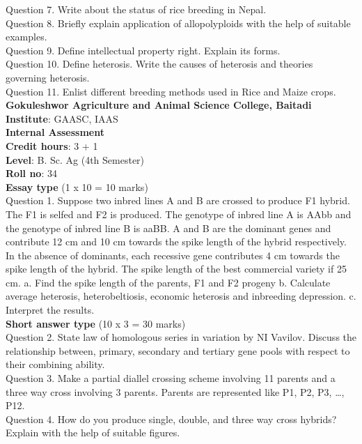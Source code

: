 \documentclass[12pt]{article}\usepackage[]{graphicx}\usepackage[]{color}
\begin{document}
Question 7. Write about the status of rice breeding in Nepal.\\
Question 8. Briefly explain application of allopolyploids with the help of suitable examples.\\
Question 9. Define intellectual property right. Explain its forms.\\
Question 10. Define heterosis. Write the causes of heterosis and theories governing heterosis.\\
Question 11. Enlist different breeding methods used in Rice and Maize crops.\\
\clearpage 
{\centering \Large{\textbf{Gokuleshwor Agriculture and Animal Science College, Baitadi}} \\[0.25cm]
            \textbf{Institute}: GAASC, IAAS \\[0.2cm]
            \textbf{Internal Assessment} \\[0.2cm]} 
\textbf{Credit hours}: 3 + 1 \\ 
\textbf{Level}: B. Sc. Ag (4th Semester) \\
\textbf{Roll no}: 34 \\[0.5cm] 
\textbf{Essay type} (1 x 10 = 10 marks) \\
Question 1. Suppose two inbred lines A and B are crossed to produce F1 hybrid. The F1 is selfed and F2 is produced. The genotype of inbred line A is AAbb and the genotype of inbred line B is aaBB. A and B are the dominant genes and contribute 12 cm and 10 cm towards the spike length of the hybrid respectively. In the absence of dominants, each recessive gene contributes 4 cm towards the spike length of the hybrid. The spike length of the best commercial variety if 25 cm. a. Find the spike length of the parents, F1 and F2 progeny b. Calculate average heterosis, heterobeltiosis, economic heterosis and inbreeding depression. c. Interpret the results.\\
\textbf{Short answer type} (10 x 3 = 30 marks) \\
Question 2. State law of homologous series in variation by NI Vavilov. Discuss the relationship between, primary, secondary and tertiary gene pools with respect to their combining ability.\\
Question 3. Make a partial diallel crossing scheme involving 11 parents and a three way cross involving 3 parents. Parents are represented like P1, P2, P3, …, P12.\\
Question 4. How do you produce single, double, and three way cross hybrids? Explain with the help of suitable figures.\\
\end{document}
